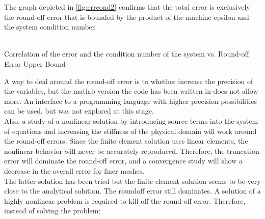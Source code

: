 \documentclass[a4paper,12pt]{article}
\makeatletter
\newenvironment{figurehere}
  {\def\@captype{figure}}
  {}
\makeatother
\begin{document}
The graph depicted in \ref{fig:errcond2} confirms that the total error is exclusively the round-off error that is bounded by the product of the machine epsilon and the system condition number. 
\begin{center}
\begin{figurehere}
\\
\caption{Correlation of the error and the condition number of the system vs. Round-off Error Upper Bound}\label{fig:errcond2}
\end{figurehere}
\end{center}
A way to deal around the round-off error is to whether increase the precision of the variables, but the matlab version the code has been written in does not allow more. An interface to a programming language with higher precision possibilities can be used, but was not explored at this stage.\\
Also, a study of a nonlinear solution by introducing source terms into the system of equations and increasing the stiffness of the physical domain will work around the round-off errors. Since the finite element solution uses linear elements, the nonlinear behavior will never be accurately reproduced. Therefore, the truncation error will dominate the round-off error, and a convergence study will show a decrease in the overall error for finer meshes.\\
The latter solution has been tried but the finite element solution seems to be very close to the analytical solution. The roundoff error still dominates. A solution of a highly nonlinear problem is required to kill off the round-off error. Therefore, instead of solving the problem:
\end{document}

